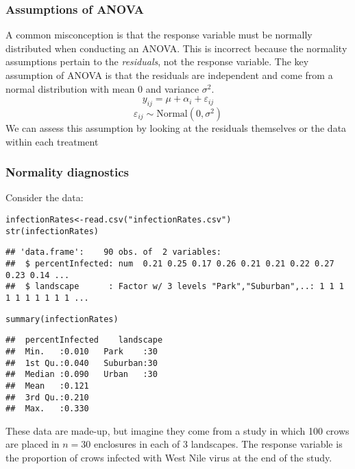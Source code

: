 \documentclass[color=usenames,dvipsnames]{beamer}\usepackage[]{graphicx}\usepackage[]{color}
\makeatletter
\newcommand{\hlstr}[1]{\textcolor[rgb]{0.749,0.012,0.012}{#1}}%
\newcommand{\hlstd}[1]{\textcolor[rgb]{0,0,0}{#1}}%
\newcommand{\hlkwb}[1]{\textcolor[rgb]{0,0.341,0.682}{#1}}%
\newcommand{\hlkwd}[1]{\textcolor[rgb]{0.004,0.004,0.506}{#1}}%
\newenvironment{kframe}{%
 \def\at@end@of@kframe{}%
 \ifinner\ifhmode%
  \def\at@end@of@kframe{\end{minipage}}%
  \begin{minipage}{\columnwidth}%
 \fi\fi%
 \def\FrameCommand##1{\hskip\@totalleftmargin \hskip-\fboxsep
 \colorbox{shadecolor}{##1}\hskip-\fboxsep
     \hskip-\linewidth \hskip-\@totalleftmargin \hskip\columnwidth}%
 \MakeFramed {\advance\hsize-\width
   \@totalleftmargin\z@ \linewidth\hsize
   \@setminipage}}%
 {\par\unskip\endMakeFramed%
 \at@end@of@kframe}
\newenvironment{knitrout}{}{} %
\makeatother
\begin{document}




\begin{frame}
  \frametitle{Assumptions of ANOVA}
  {%
    A common misconception is that the response variable must be
    normally distributed when conducting an ANOVA.}
  \pause
  \vfill
  {%
    This is incorrect because the normality assumptions pertain to
    the {\it residuals}, \alert{not} the response variable. The key assumption of
    ANOVA is that the residuals are independent and come from a normal
    distribution with mean 0 and variance $\sigma^2$.}
  \pause
  \large
\[
  y_{ij} = \mu + \alpha_i + \varepsilon_{ij}
\]
\[
  \varepsilon_{ij} \sim \text{Normal}(0, \sigma^2)
\]
\pause
\vfill
\normalsize
  {%
    We can assess this assumption by looking at the residuals
    themselves or the data within each treatment}
\end{frame}





\begin{frame}[fragile]
  \frametitle{Normality diagnostics}

\small
    Consider the data: %
\begin{knitrout}\tiny
{}\color{fgcolor}\begin{kframe}
\begin{alltt}
\hlstd{infectionRates} \hlkwb{<-} \hlkwd{read.csv}\hlstd{(}\hlstr{"infectionRates.csv"}\hlstd{)}
\hlkwd{str}\hlstd{(infectionRates)}
\end{alltt}
\begin{verbatim}
## 'data.frame':	90 obs. of  2 variables:
##  $ percentInfected: num  0.21 0.25 0.17 0.26 0.21 0.21 0.22 0.27 0.23 0.14 ...
##  $ landscape      : Factor w/ 3 levels "Park","Suburban",..: 1 1 1 1 1 1 1 1 1 1 ...
\end{verbatim}
\begin{alltt}
\hlkwd{summary}\hlstd{(infectionRates)}
\end{alltt}
\begin{verbatim}
##  percentInfected    landscape 
##  Min.   :0.010   Park    :30  
##  1st Qu.:0.040   Suburban:30  
##  Median :0.090   Urban   :30  
##  Mean   :0.121                
##  3rd Qu.:0.210                
##  Max.   :0.330
\end{verbatim}
\end{kframe}
\end{knitrout}
\vfill
These data are made-up, but imagine they come from a study in which
100 crows are placed in $n=30$ enclosures in each of 3 landscapes. The
response variable is the proportion of crows infected with West Nile
virus at the end of the study. \\
\end{frame}
\end{document}

